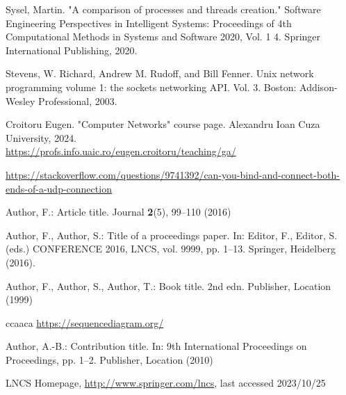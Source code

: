 \documentclass[runningheads]{llncs}
\begin{document}
% 
% 

\begin{thebibliography}{8}
Sysel, Martin. "A comparison of processes and threads creation." Software Engineering Perspectives in Intelligent Systems: Proceedings of 4th Computational Methods in Systems and Software 2020, Vol. 1 4. Springer International Publishing, 2020. 

 Stevens, W. Richard, Andrew M. Rudoff, and Bill Fenner. Unix network programming volume 1: the sockets networking API. Vol. 3. Boston: Addison-Wesley Professional, 2003.

  Croitoru Eugen. "Computer Networks" course page. Alexandru Ioan Cuza University, 2024. \\
  \url{https://profs.info.uaic.ro/eugen.croitoru/teaching/ga/}

\url{https://stackoverflow.com/questions/9741392/can-you-bind-and-connect-both-ends-of-a-udp-connection}

Author, F.: Article title. Journal \textbf{2}(5), 99--110 (2016)

Author, F., Author, S.: Title of a proceedings paper. In: Editor,
F., Editor, S. (eds.) CONFERENCE 2016, LNCS, vol. 9999, pp. 1--13.
Springer, Heidelberg (2016). 

Author, F., Author, S., Author, T.: Book title. 2nd edn. Publisher,
Location (1999)

 ccaaca \url{https://sequencediagram.org/}

Author, A.-B.: Contribution title. In: 9th International Proceedings
on Proceedings, pp. 1--2. Publisher, Location (2010)

LNCS Homepage, \url{http://www.springer.com/lncs}, last accessed 2023/10/25
\end{thebibliography}
\end{document}
